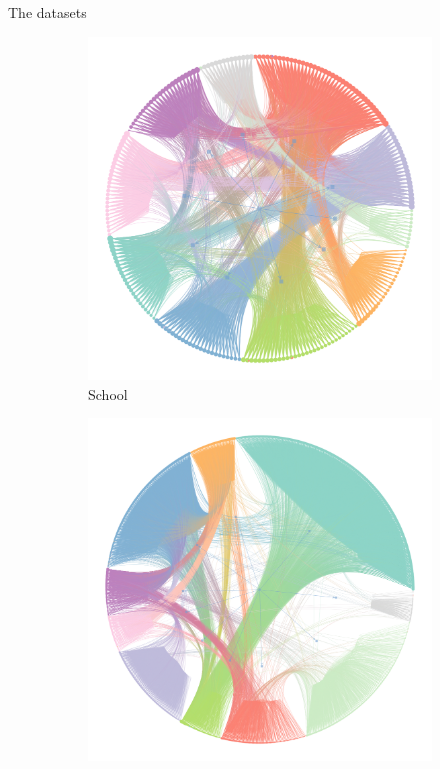 \documentclass{beamer}
\begin{document}
\begin{frame}{The datasets}
\begin{figure}[!h]
\begin{subfigure}[t]{0.3\linewidth}
				\includegraphics[width=\linewidth]{school-graph.png}
				\caption{School}
				\label{fig:school-graph}
			\end{subfigure}
			\hfill
			\begin{subfigure}[t]{0.3\linewidth}
				\centering
				\includegraphics[width=\linewidth]{fb-graph.png}

\end{subfigure}
\end{figure}
\end{frame}
\end{document}
